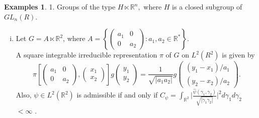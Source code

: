 \documentclass[11pt,reqno]{amsart}
\numberwithin{equation}{section}
\theoremstyle{definition}
\newtheorem{exs}[thm]{\sc Examples}
\begin{document}
\begin{exs}\label{eg}
1. Groups of the type $ H \ltimes \mathbb{R}^n ,$ where $H$ is a closed subgroup of $GL_n(R).$
\begin{enumerate}[(i)]

\item Let $G =  A  \ltimes \mathbb{R}^2$, where 
$A = \left \{ \begin{pmatrix}
a_1 & 0\\
0 & a_2 
\end{pmatrix} : a_1,a_2 \in \mathbb{R}^* \right\}$.\\
 A  square integrable irreducible representation $\pi$ of $G$ on $L^2(R^2)$ is given by
 $$\pi\left[ \begin{pmatrix}
a_1 & 0\\
0 & a_2
\end{pmatrix}, \begin{pmatrix}
 x_1\\
 x_2
\end{pmatrix}\right] g \begin{pmatrix}
y_1\\
y_2
\end{pmatrix} = \frac{1}{\sqrt{|a_1a_2|}}g\begin{pmatrix}
(y_1-x_1)/a_1\\ (y_2 -x_2)/a_2
\end{pmatrix}.$$
Also, $\psi \in L^2(\mathbb{R}^2)$ is admissible if and only if 
$ C_{\psi} = \int_{\mathbb{R}^2} \Big| \frac{\widehat{\psi}(\gamma_1,\gamma_2)}{\sqrt{|\gamma_1\gamma_2|}}\Big|^2 d\gamma_1 d\gamma_2$ $ < \infty$  \cite{Dav:96}.


\end{enumerate}
\end{exs}
\end{document}
